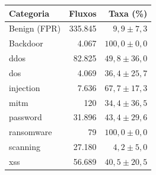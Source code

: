 \begin{tabular}{lrr}
\toprule
Categoria & Fluxos & Taxa (\%) \\
\midrule
Benign (FPR) & 335.845 & $9,9 \pm 7,3$ \\
\midrule
Backdoor & 4.067 & $100,0 \pm 0,0$ \\
ddos & 82.825 & $49,8 \pm 36,0$ \\
dos & 4.069 & $36,4 \pm 25,7$ \\
injection & 7.636 & $67,7 \pm 17,3$ \\
mitm & 120 & $34,4 \pm 36,5$ \\
password & 31.896 & $43,4 \pm 29,6$ \\
ransomware & 79 & $100,0 \pm 0,0$ \\
scanning & 27.180 & $4,2 \pm 5,0$ \\
xss & 56.689 & $40,5 \pm 20,5$ \\
\bottomrule
\end{tabular}

